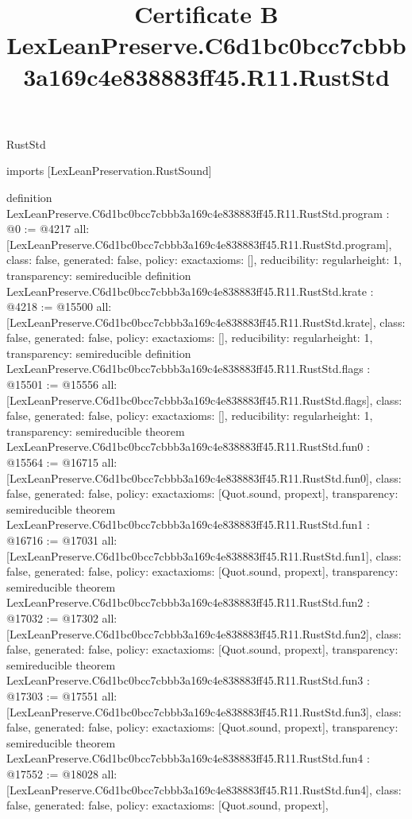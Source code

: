 \begin{lexlean}{RustStd}
\title{Certificate B LexLeanPreserve.C6d1bc0bcc7cbbb3a169c4e838883ff45.R11.RustStd}
\begin{coremodule}
imports [LexLeanPreservation.RustSound]

definition LexLeanPreserve.C6d1bc0bcc7cbbb3a169c4e838883ff45.R11.RustStd.program : @0 := @4217 {
  all: [LexLeanPreserve.C6d1bc0bcc7cbbb3a169c4e838883ff45.R11.RustStd.program],
  class: false,
  generated: false,
  policy: exact{axioms: []},
  reducibility: regular{height: 1},
  transparency: semireducible
}
definition LexLeanPreserve.C6d1bc0bcc7cbbb3a169c4e838883ff45.R11.RustStd.krate : @4218 := @15500 {
  all: [LexLeanPreserve.C6d1bc0bcc7cbbb3a169c4e838883ff45.R11.RustStd.krate],
  class: false,
  generated: false,
  policy: exact{axioms: []},
  reducibility: regular{height: 1},
  transparency: semireducible
}
definition LexLeanPreserve.C6d1bc0bcc7cbbb3a169c4e838883ff45.R11.RustStd.flags : @15501 := @15556 {
  all: [LexLeanPreserve.C6d1bc0bcc7cbbb3a169c4e838883ff45.R11.RustStd.flags],
  class: false,
  generated: false,
  policy: exact{axioms: []},
  reducibility: regular{height: 1},
  transparency: semireducible
}
theorem LexLeanPreserve.C6d1bc0bcc7cbbb3a169c4e838883ff45.R11.RustStd.fun0 : @15564 := @16715 {
  all: [LexLeanPreserve.C6d1bc0bcc7cbbb3a169c4e838883ff45.R11.RustStd.fun0],
  class: false,
  generated: false,
  policy: exact{axioms: [Quot.sound, propext]},
  transparency: semireducible
}
theorem LexLeanPreserve.C6d1bc0bcc7cbbb3a169c4e838883ff45.R11.RustStd.fun1 : @16716 := @17031 {
  all: [LexLeanPreserve.C6d1bc0bcc7cbbb3a169c4e838883ff45.R11.RustStd.fun1],
  class: false,
  generated: false,
  policy: exact{axioms: [Quot.sound, propext]},
  transparency: semireducible
}
theorem LexLeanPreserve.C6d1bc0bcc7cbbb3a169c4e838883ff45.R11.RustStd.fun2 : @17032 := @17302 {
  all: [LexLeanPreserve.C6d1bc0bcc7cbbb3a169c4e838883ff45.R11.RustStd.fun2],
  class: false,
  generated: false,
  policy: exact{axioms: [Quot.sound, propext]},
  transparency: semireducible
}
theorem LexLeanPreserve.C6d1bc0bcc7cbbb3a169c4e838883ff45.R11.RustStd.fun3 : @17303 := @17551 {
  all: [LexLeanPreserve.C6d1bc0bcc7cbbb3a169c4e838883ff45.R11.RustStd.fun3],
  class: false,
  generated: false,
  policy: exact{axioms: [Quot.sound, propext]},
  transparency: semireducible
}
theorem LexLeanPreserve.C6d1bc0bcc7cbbb3a169c4e838883ff45.R11.RustStd.fun4 : @17552 := @18028 {
  all: [LexLeanPreserve.C6d1bc0bcc7cbbb3a169c4e838883ff45.R11.RustStd.fun4],
  class: false,
  generated: false,
  policy: exact{axioms: [Quot.sound, propext]},
}
\end{coremodule}
\end{lexlean}

